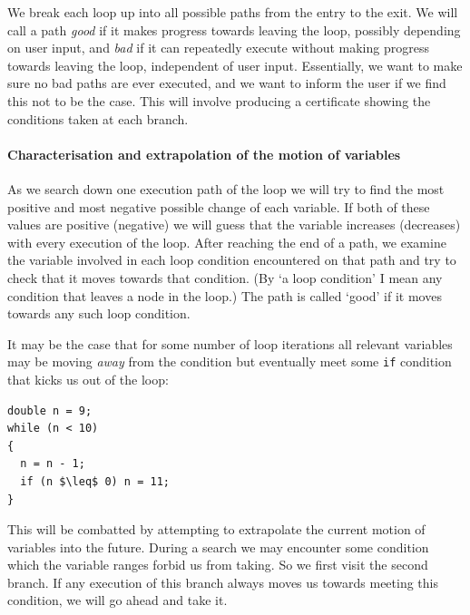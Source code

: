 \documentclass[12pt,a4paper]{article}
\begin{document}
We break each loop up into all possible paths from the entry to the exit. We will call a path \emph{good} if it makes progress towards leaving the loop,
possibly depending on user input, and \emph{bad} if it can repeatedly execute without making progress towards leaving the loop, independent of user input.
Essentially, we want to make sure no bad paths are ever executed, and we want to inform the user if we find this not to be the case.
This will involve producing a certificate showing the conditions taken at each branch.

\paragraph{Characterisation and extrapolation of the motion of variables}
As we search down one execution path of the loop we will try to find the most positive and most negative possible change of each variable. If both of these values
are positive (negative) we will guess that the variable increases (decreases) with every execution of the loop. After reaching the end of a path, we examine the 
variable involved in each loop condition encountered on that path and try to check that it moves towards that condition. (By `a loop condition' I mean any condition that leaves a 
node in the loop.) The path is called `good' if it moves towards any such loop condition.

It may be the case that for some number of loop iterations all relevant variables may be moving \textit{away} from the 
condition but eventually meet some \texttt{if} condition that kicks us out of the loop:

\begin{center}
\begin{minipage}{6.5cm}
\begin{lstlisting}[frame=tlrb,language=myLang,label={lst:trickloop}, mathescape=true, numbers=none]
double n = 9;
while (n < 10)
{
  n = n - 1;
  if (n $\leq$ 0) n = 11;
}
\end{lstlisting}
\end{minipage}
\end{center}

This will be combatted by attempting to extrapolate the current motion of variables into the future. During a search we may encounter some condition
which the variable ranges forbid us from taking. So we first visit the second branch. If any execution of this branch always moves us towards meeting
this condition, we will go ahead and take it.
\end{document}
